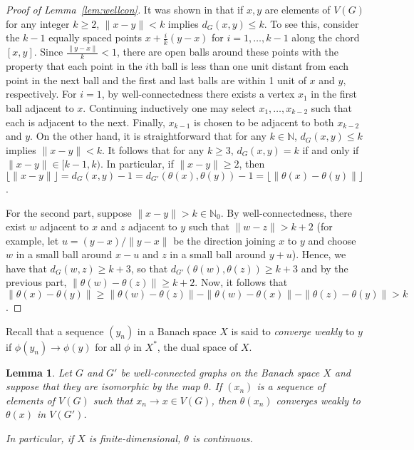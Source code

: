 \documentclass{daj}
\newtheorem{lem}[thm]{Lemma}
\newcommand{\N}{\mathbb N}
\begin{document}
\begin{proof}[Proof of Lemma~\ref{lem:wellcon}]
It was shown in \cite{BJ1} that if $x,y$ are elements of $V(G)$ for any integer $k\ge 2$, $\|x-y\|<k$
implies $d_G(x,y)\le k$. To see this, consider the $k-1$ equally spaced points
$x+\frac{i}{k}(y-x)$ for $i=1,\ldots, k-1$ along the chord $[x,y]$.
Since $\frac{\|y-x\|}{k}<1$, there are open balls around these points
with the property that each point in the $i$th ball is less than one unit distant from each point in the next ball
and the first and last balls are within 1 unit of $x$ and $y,$ respectively.
For $i=1$, by well-connectedness there exists a vertex $x_1$ in the first ball adjacent to $x$.
Continuing inductively one may select $x_1,\ldots,x_{k-2}$ such that each is adjacent to the next.
Finally, $x_{k-1}$ is chosen to be adjacent to both $x_{k-2}$ and $y$.
On the other hand, it is straightforward that for any $k\in\N$,
$d_G(x,y)\le k$ implies $\|x-y\|<k$.
It follows that for any $k\ge 3$, $d_G(x,y)=k$ if and only if $\|x-y\|\in [k-1,k)$.
In particular, if $\|x-y\|\ge 2$, then $\lfloor \|x-y\|\rfloor=d_G(x,y)-1=d_{G'}(\theta(x),\theta(y))-
1=\lfloor\|\theta(x)-\theta(y)\|\rfloor$.

For the second part, suppose $\|x-y\|>k\in\N_0$. By well-connectedness,
there exist $w$ adjacent to $x$
and $z$ adjacent to $y$ such that $\|w-z\|>k+2$
(for example, let $u=(y-x)/\|y-x\|$ be the direction joining $x$ to $y$
and choose $w$ in a small ball around $x-u$ and $z$ in a small ball around $y+u$).
Hence, we have that $d_G(w,z)\ge k+3$, so that
$d_{G'}(\theta(w),\theta(z))\ge k+3$ and
by the previous part, $\|\theta(w)-\theta(z)\|\ge k+2$.
Now, it follows that $\|\theta(x)-\theta(y)\|\ge \|\theta(w)-\theta(z)\|-\|\theta(w)-\theta(x)\|
-\|\theta(z)-\theta(y)\|>k$.
\end{proof}

Recall that a sequence $(y_n)$ in a Banach space $X$ is said to \emph{converge weakly} to $y$
if $\phi(y_n)\to \phi(y)$ for all $\phi$ in $X^*$, the dual space of $X$.

\begin{lem}\label{lem:contin}
Let $G$ and $G'$ be well-connected graphs on the Banach space $X$ and suppose that
they are isomorphic by the map $\theta$.
If $(x_n)$ is a sequence of elements of $V(G)$ such that $x_n\to x\in V(G)$,
then $\theta(x_n)$ converges weakly to $\theta(x)$ in $V(G')$.

In particular, if $X$ is finite-dimensional, $\theta$ is continuous.
\end{lem}
\end{document}
